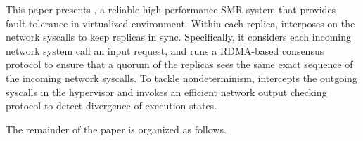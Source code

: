 This paper presents \xxx, a reliable high-performance SMR system that provides fault-tolerance 
in virtualized environment. Within each replica, \xxx interposes on the network syscalls to keep 
replicas in sync. Specifically, it considers each incoming network system call  an input request, 
and runs a RDMA-based \paxos consensus protocol to ensure that a quorum of the replicas sees the 
same exact sequence of the incoming network syscalls. To tackle nondeterminism, \xxx intercepts 
the outgoing syscalls in the hypervisor and invokes an efficient network output checking protocol 
to detect divergence of execution states.

The remainder of the paper is organized as follows.
